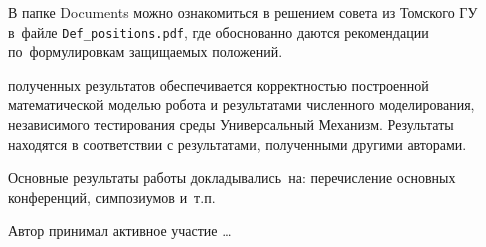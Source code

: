 В папке Documents можно ознакомиться в решением совета из Томского ГУ
в~файле \verb+Def_positions.pdf+, где обоснованно даются рекомендации
по~формулировкам защищаемых положений. 

{\reliability} полученных результатов обеспечивается корректностью построенной математической моделью робота и результатами численного моделирования, независимого тестирования среды Универсальный Механизм. Результаты находятся в соответствии с результатами, полученными другими авторами.


{\probation}
Основные результаты работы докладывались~на:
перечисление основных конференций, симпозиумов и~т.\:п.

{\contribution} Автор принимал активное участие \ldots


